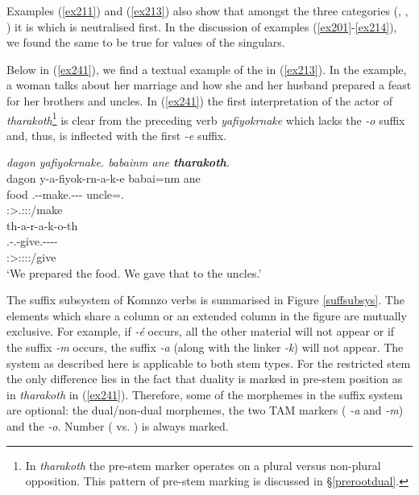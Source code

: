 Examples (\ref{ex211}) and (\ref{ex213}) also show that amongst the three categories (, , ) it is  which is neutralised first. In the discussion of examples (\ref{ex201}-\ref{ex214}), we found the same to be true for  values of the singulars.%

Below in (\ref{ex241}), we find a textual example of the   in (\ref{ex213}). In the example, a woman talks about her marriage and how she and her husband prepared a feast for her brothers and uncles. In (\ref{ex241}) the first  interpretation of the actor of \emph{tharakoth}\footnote{In \emph{tharakoth} the pre-stem marker operates on a plural versus non-plural opposition. This pattern of pre-stem marking is discussed in \S{}\ref{prerootdual}.} is clear from the preceding verb \emph{yafiyokrnake} which lacks the  \emph{-o} suffix and, thus, is inflected with the first  \emph{-e} suffix.

\begin{exe}
	\ex \emph{dagon yafiyokrnake. babainm ane \textbf{tharakoth}.}\\
	\glll dagon y-a-fiyok-rn-a-k-e babai=nm ane\\
	food \Tsg.\Masc-\Vc-make.\Ext-\Pst-\Lk-\Fnsg{} uncle=\Dat.\Nsg{} \Dem{}\\
	{} \footnotesize{\Fdu:\Sbj>\Tsg.\Masc:\Obj:\Pst:\Ipfv/make} {} {}\\
	\sn
	\glll th-a-r-a-k-o-th\\
	\Stnsg.\Gam-\Vc.\Du-give.\Rs-\Pst-\Lk-\Andat-\Nsg\\
	\footnotesize{\Fdu:\Sbj>\Stpl:\Io:\Pst:\Pfv:\Andat/give}\\
	\trans `We prepared the food. We gave that to the uncles.' 
	\label{ex241}
\end{exe}

The suffix subsystem of Komnzo verbs is summarised in Figure \ref{suffsubsys}. The elements which share a column or an extended column in the figure are mutually exclusive. For example, if \emph{-é} occurs, all the other material will not appear or if the  suffix \emph{-m} occurs, the  suffix \emph{-a} (along with the linker \emph{-k}) will not appear. The system as described here is applicable to both stem types. For the restricted stem the only difference lies in the fact that duality is marked in pre-stem position as in \emph{tharakoth} in (\ref{ex241}). Therefore, some of the morphemes in the suffix system are optional: the dual/non-dual morphemes, the two TAM markers (\Pst{} \emph{-a} and \Dur{} \emph{-m}) and the  \emph{-o}. Number (\Sg{} vs. \Nsg) is always marked.

